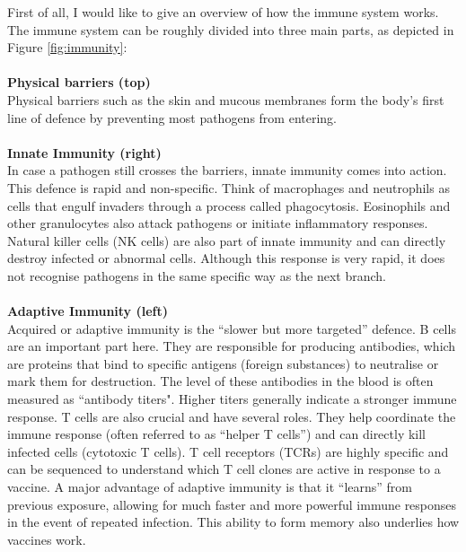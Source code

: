 \documentclass[12pt,a4paper]{report}
\begin{document}
First of all, I would like to give an overview of how the immune system works. The immune system can be roughly divided into three main parts, as depicted in Figure \ref{fig:immunity}:\\
\\
\textbf{Physical barriers (top)}\\
Physical barriers such as the skin and mucous membranes form the body’s first line of defence by preventing most pathogens from entering.\\
\\
\textbf{Innate Immunity (right)}\\
In case a pathogen still crosses the barriers, innate immunity comes into action. This defence is rapid and non-specific. Think of macrophages and neutrophils as cells that engulf invaders through a process called phagocytosis. Eosinophils and other granulocytes also attack pathogens or initiate inflammatory responses. Natural killer cells (NK cells) are also part of innate immunity and can directly destroy infected or abnormal cells. Although this response is very rapid, it does not recognise pathogens in the same specific way as the next branch. \cite{janeway2001immunobiology}\\
\\
\textbf{Adaptive Immunity (left)}\\
Acquired or adaptive immunity is the “slower but more targeted” defence. B cells are an important part here. They are responsible for producing antibodies, which are proteins that bind to specific antigens (foreign substances) to neutralise or mark them for destruction. The level of these antibodies in the blood is often measured as “antibody titers". Higher titers generally indicate a stronger immune response. T cells are also crucial and have several roles. They help coordinate the immune response (often referred to as “helper T cells”) and can directly kill infected cells (cytotoxic T cells). T cell receptors (TCRs) are highly specific and can be sequenced to understand which T cell clones are active in response to a vaccine. A major advantage of adaptive immunity is that it “learns” from previous exposure, allowing for much faster and more powerful immune responses in the event of repeated infection. This ability to form memory also underlies how vaccines work. \cite{janeway2001immunobiology}\\
\\
\end{document}
